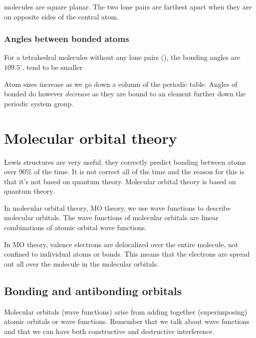 \documentclass[../mit-general-chemistry.tex]{subfiles}
\begin{document}
 molecules are square planar. The two lone pairs are
farthest apart when they are on opposite sides of the central atom.






\subsubsection{Angles between bonded atoms}



For a tetrahedral molecules without any lone pairs (), the
bonding angles are $109.5^{\circ}$. tend to be smaller


Atom sizes increase as we go down a column of the periodic
table. Angles of bonded do however {\em decrease} as they are bound to
an element further down the periodic system group.








\section{Molecular orbital theory}


Lewis structures are very useful, they correctly predict bonding
between atoms over 90\% of the time. It is not correct all of the time
and the reason for this is that it's not based on quantum
theory. Molecular orbital theory is based on quantum theory.

In molecular orbital theory, MO theory, we use wave functions to
describe molecular orbitals. The wave functions of molecular orbitals
are linear combinations of atomic orbital wave functions.

In MO theory, valence electrons are delocalized over the entire
molecule, not confined to individual atoms or bonds. This means that
the electrons are spread out all over the molecule in the molecular
orbitals.






\subsection{Bonding and antibonding orbitals}

Molecular orbitals (wave functions) arise from adding together
(superimposing) atomic orbitals or wave functions. Remember that we
talk about wave functions and that we can have both constructive and
destructive interference.
\end{document}
